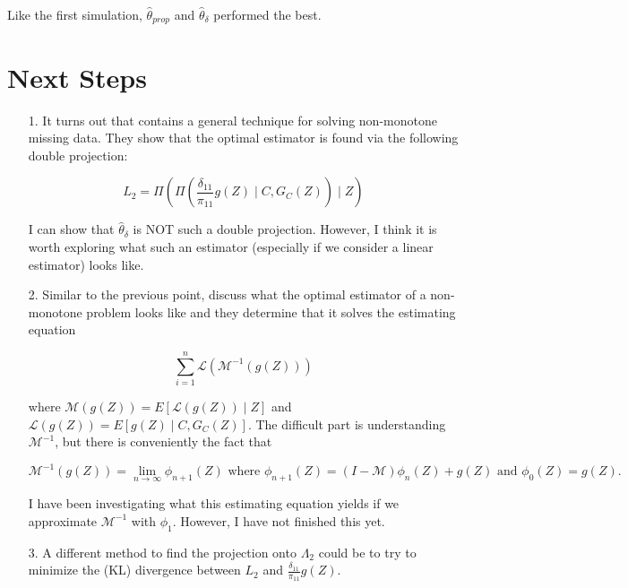 \documentclass[12pt]{article}
\begin{document}
Like the first simulation, $\hat \theta_{prop}$ and $\hat \theta_{\delta}$ 
performed the best.

\section*{Next Steps}

\begin{itemize}
  \item[1.] It turns out that \cite{tsiatis2006semiparametric} contains 
    a general technique for solving non-monotone missing data. They show 
    that the optimal estimator is found via the following double projection:

    \[L_2 = \Pi\left(\Pi\left(\frac{\delta_{11}}{\pi_{11}}g(Z) \mid C,
    G_C(Z)\right) \mid Z\right)\]

    I can show that $\hat \theta_\delta$ is NOT such a double projection. 
    However, I think it is worth exploring what such an estimator (especially 
    if we consider a linear estimator) looks like.
  \item[2.] Similar to the previous point, \cite{tsiatis2006semiparametric} 
    discuss what the optimal estimator of a non-monotone problem looks like 
    and they determine that it solves the estimating equation

    \[\sum_{i = 1}^n \mathcal{L}(\mathcal{M}^{-1}(g(Z)))\]

    where $\mathcal{M}(g(Z)) = E[\mathcal{L}(g(Z)) \mid Z]$ and 
    $\mathcal{L}(g(Z)) = E[g(Z) \mid C, G_C(Z)]$. The difficult part is 
    understanding $\mathcal{M}^{-1}$, but there is conveniently the fact that

    \[\mathcal{M}^{-1}(g(Z)) = \lim_{n \to \infty} \phi_{n + 1}(Z) \text{ where } 
      \phi_{n + 1}(Z) = (I - \mathcal{M}) \phi_n(Z) + g(Z) \text{ and }
    \phi_0(Z) = g(Z).\]

    I have been investigating what this estimating equation yields if we 
    approximate $\mathcal{M}^{-1}$ with $\phi_1$. However, I have not 
    finished this yet.
  \item[3.] A different method to find the projection onto $\Lambda_2$ 
    could be to try to minimize the (KL) divergence between 
    $L_2$ and $\frac{\delta_{11}}{\pi_{11}}g(Z)$.
\end{itemize}

\newpage 

\printbibliography

\newpage

\appendix
\end{document}
